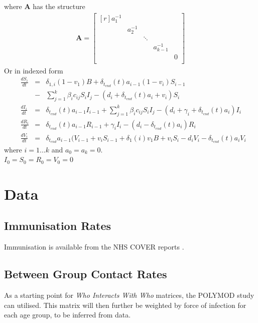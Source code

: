 \documentclass{article}
\theoremstyle{definition}
\begin{document}
  where $\mathbf{A}$ has the structure
\begin{gather*}
\mathbf{A}=\begin{bmatrix}[r]
  a_1^{-1} &            &           &              &   \\
           &   a_2^{-1} &           &              &   \\
           &            & \ddots    &              &   \\
           &            &           & a_{k-1}^{-1} &   \\
           &            &		        &              & 0 \\
\end{bmatrix}
\end{gather*}
Or in indexed form
\begin{align*}
  &\frac{dS_{i}}{dt}&=&\delta_{1,i}(1-v_1)B + \delta_{t_{end}}(t)a_{i-1}(1-v_i)S_{i-1}\\&&-&\sum_{j=1}^{k}\beta_{i}c_{ij}S_{i}I_{j}-(d_{i} + \delta_{t_{end}}(t)a_{i} + v_{i})S_{i}\\
  &\frac{dI_{i}}{dt} &=&\delta_{t_{end}}(t)a_{i-1}I_{i-1}+\sum_{j=1}^{k}\beta_{i}c_{ij}S_{i}I_{j}-(d_{i}+\gamma_{i}+\delta_{t_{end}}(t)a_{i})I_{i}\\
  &\frac{dR_{i}}{dt} &=& \delta_{t_{end}}(t)a_{i-1}R_{i-1}+\gamma_{i}I_{i}-(d_{i}-\delta_{t_{end}}(t)a_{i})R_{i}\\
  &\frac{dV_{i}}{dt} &=& \delta_{t_{end}}a_{i-1}(V_{i-1}+v_iS_{i-1} + \delta_1(i)v_1B+v_iS_i-d_{i}V_{i}-\delta_{t_{end}}(t)a_{i}V_{i}
\end{align*}
where $i=1...k$ and $a_0 = a_k = 0$.\\
$I_0=S_0=R_0=V_0=0$
\section{Data}
\subsection{Immunisation Rates}
Immunisation is available from the NHS COVER reports \cite{noauthor_childhood_nodate}.
\subsection{Between Group Contact Rates}
As a starting point for \emph{Who Interacts With Who} matrices, the POLYMOD study \cite{mossong_social_2008} can utilised. This matrix will then further be weighted by force of infection for each age group, to be inferred from data.
\end{document}
